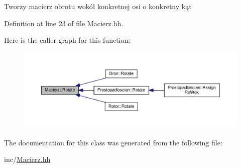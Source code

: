 Tworzy macierz obrotu wokół konkretnej osi o konkretny kąt 

Definition at line 23 of file Macierz.\+hh.

Here is the caller graph for this function\+:
\nopagebreak
\begin{figure}[H]
\begin{center}
\leavevmode
\includegraphics[width=350pt]{class_macierz_ad7d0f072e450b04740723cfa7b13af17_icgraph}
\end{center}
\end{figure}


The documentation for this class was generated from the following file\+:\begin{DoxyCompactItemize}
\item 
inc/\hyperlink{_macierz_8hh}{Macierz.\+hh}\end{DoxyCompactItemize}
